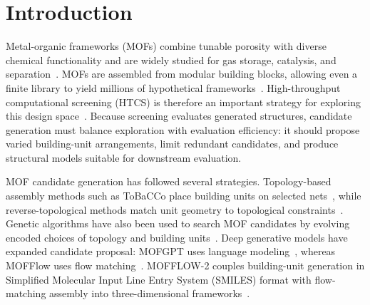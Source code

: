 \documentclass[a5paper, 10pt]{article}
\begin{document}
\section{Introduction}
\label{sec:intro}
Metal-organic frameworks (MOFs) combine tunable porosity with diverse chemical functionality and are widely studied for gas storage, catalysis, and separation~\cite{furukawa2013chemistry}.
MOFs are assembled from modular building blocks, allowing even a finite library to yield millions of hypothetical frameworks~\cite{wilmer2012large}. High-throughput computational screening (HTCS) is therefore an important strategy for exploring this design space~\cite{colon2014high}.
Because screening evaluates generated structures, candidate generation must balance exploration with evaluation efficiency: it should propose varied building-unit arrangements, limit redundant candidates, and produce structural models suitable for downstream evaluation.%

MOF candidate generation has followed several strategies. Topology-based assembly methods such as ToBaCCo place building units on selected nets~\cite{colon2017topologically}, while reverse-topological methods match unit geometry to topological constraints~\cite{wu2024precisionmof}. Genetic algorithms have also been used to search MOF candidates by evolving encoded choices of topology and building units~\cite{pham2025genetic}. Deep generative models have expanded candidate proposal: MOFGPT uses language modeling~\cite{badrinarayanan2025mofgpt}, whereas MOFFlow uses flow matching~\cite{Kim2024MOFFlowFM}. MOFFLOW-2 couples building-unit generation in Simplified Molecular Input Line Entry System (SMILES) format with flow-matching assembly into three-dimensional frameworks~\cite{kim2025flexiblemof}.%
\end{document}
